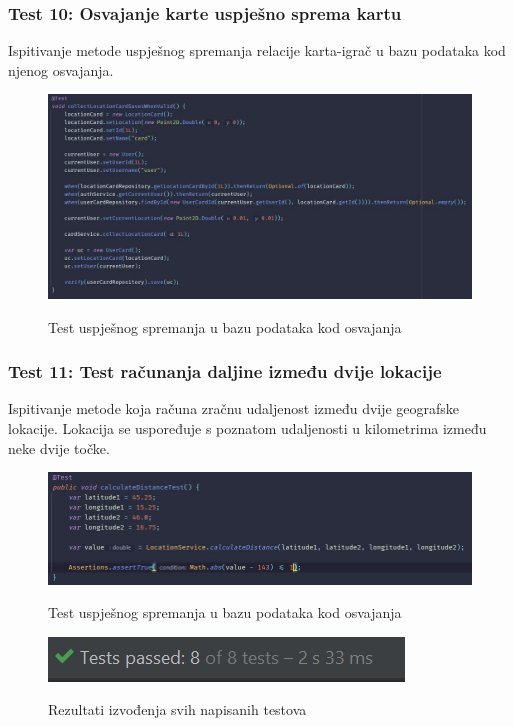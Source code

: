 			\subsubsection{Test 10: Osvajanje karte uspješno sprema kartu}
			Ispitivanje metode uspješnog spremanja relacije karta-igrač u bazu podataka kod njenog osvajanja.
			
			\begin{figure}[H]
				\centering
				\includegraphics[scale=0.55]{slike/test10} \\
				\caption{ Test uspješnog spremanja u bazu podataka kod osvajanja}
				\label{fig:test10}
			\end{figure}
		
			\subsubsection{Test 11: Test računanja daljine između dvije lokacije}
			Ispitivanje metode koja računa zračnu udaljenost između dvije geografske lokacije.
			Lokacija se uspoređuje s poznatom udaljenosti u kilometrima između neke dvije točke.
			
			\begin{figure}[H]
				\centering
				\includegraphics[scale=0.70]{slike/test11} \\
				\caption{ Test uspješnog spremanja u bazu podataka kod osvajanja}
				\label{fig:test10}
			\end{figure}
			
			\begin{figure}[H]
				\centering
				\includegraphics[scale=1]{slike/ishodTestova} \\
				\caption{ Rezultati izvođenja svih napisanih testova}
				\label{fig:ishodTestova}
			\end{figure}
			
